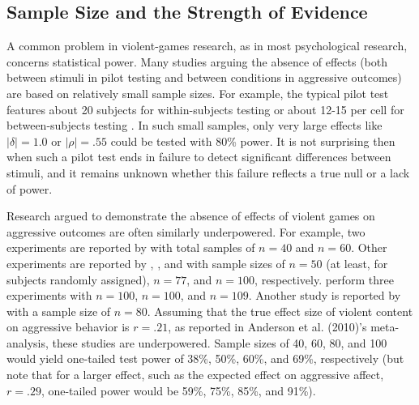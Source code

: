 \documentclass[man]{apa6}
\begin{document}
\subsection{Sample Size and the Strength of Evidence}
A common problem in violent-games research, as in most psychological research, concerns statistical power. Many studies arguing the absence of effects (both between stimuli in pilot testing and between conditions in aggressive outcomes) are based on relatively small sample sizes.   For example, the typical pilot test features about 20 subjects for within-subjects testing \citep[e.g.,][]{Arriaga:etal:2008} or about 12-15 per cell for between-subjects testing \citep[e.g.,][]{Anderson:etal:2004,Valadez:Ferguson:2012}. In such small samples, only very large effects like $|\delta| = 1.0$ or $|\rho| = .55$ could be tested with 80\% power. It is not surprising then when such a pilot test ends in failure to detect significant differences between stimuli, and it remains unknown whether this failure reflects a true null or a lack of power.

Research argued to demonstrate the absence of effects of violent games on aggressive outcomes are often similarly underpowered. For example, two experiments are reported by \citet{Adachi:Willoughby:2011} with total samples of $n = 40$ and $n = 60$. Other experiments are reported by \citet{Ferguson:etal:2008}, \citet{Ferguson:Rueda:2010}, and \citet{Valadez:Ferguson:2012} with sample sizes of $n = 50$ (at least, for subjects randomly assigned), $n = 77$, and $n = 100$, respectively. \citet[Studies 1, 2, and 5]{Przybylski:etal:2014} perform three experiments with $n = 100$, $n = 100$, and $n = 109$. Another study is reported by \citet{Elson:etal:2013} with a sample size of $ n = 80 $. Assuming that the true effect size of violent content on aggressive behavior is $r = .21$, as reported in Anderson et al. (2010)'s meta-analysis, these studies are underpowered. Sample sizes of 40, 60, 80, and 100 would yield one-tailed test power of 38\%, 50\%, 60\%, and 69\%, respectively (but note that for a larger effect, such as the expected effect on aggressive affect, $r = .29$, one-tailed power would be 59\%, 75\%, 85\%, and 91\%). 
\end{document}
